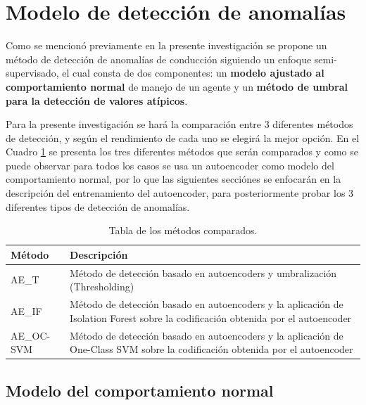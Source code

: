 \section{Modelo de detecci\'{o}n de anomal\'{i}as}

Como se mencion\'{o} previamente en la presente investigaci\'{o}n se propone un m\'{e}todo de detecci\'{o}n de anomal\'{i}as de conducci\'{o}n siguiendo un enfoque semi-supervisado, el cual consta de dos componentes: un \textbf{modelo ajustado al comportamiento normal} de manejo de un agente y un \textbf{m\'{e}todo de umbral para la detecci\'{o}n de valores at\'{i}picos}.

\vspace{5mm} %

Para la presente investigaci\'{o}n se har\'{a} la comparaci\'{o}n entre 3 diferentes m\'{e}todos de detecci\'{o}n, y seg\'{u}n el rendimiento de cada uno se elegir\'{a} la mejor opci\'{o}n. En el Cuadro \ref{table:metodos_comparados} se presenta los tres diferentes m\'{e}todos que ser\'{a}n comparados y como se puede observar para todos los casos se usa un autoencoder como modelo del comportamiento normal, por lo que las siguientes secci\'{o}nes se enfocar\'{a}n en la descripci\'{o}n del entrenamiento del autoencoder, para posteriormente probar los 3 diferentes tipos de detecci\'{o}n de anomal\'{i}as.

\begin{table}[]
\centering
\begin{tabular}{|l|p{100mm}|}
\hline
\textbf{M\'{e}todo} & \textbf{Descripci\'{o}n} \\ \hline
AE\_T & M\'{e}todo de detecci\'{o}n basado en autoencoders y umbralizaci\'{o}n (Thresholding) \\ \hline
AE\_IF & M\'{e}todo de detecci\'{o}n basado en autoencoders y la aplicaci\'{o}n de Isolation Forest sobre la codificaci\'{o}n obtenida por el autoencoder  \\ \hline
AE\_OC-SVM & M\'{e}todo de detecci\'{o}n basado en autoencoders y la aplicaci\'{o}n de One-Class SVM sobre la codificaci\'{o}n obtenida por el autoencoder \\ \hline
\end{tabular}
\caption{Tabla de los m\'{e}todos comparados.}
\label{table:metodos_comparados}
\end{table}

\subsection{Modelo del comportamiento normal}

